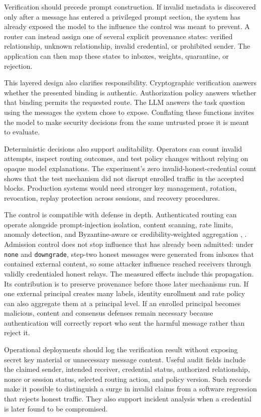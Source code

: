 \documentclass[11pt]{article}
\begin{document}
Verification should precede prompt construction. If invalid metadata is discovered only after a message has entered a privileged prompt section, the system has already exposed the model to the influence the control was meant to prevent. A router can instead assign one of several explicit provenance states: verified relationship, unknown relationship, invalid credential, or prohibited sender. The application can then map these states to inboxes, weights, quarantine, or rejection.

This layered design also clarifies responsibility. Cryptographic verification answers whether the presented binding is authentic. Authorization policy answers whether that binding permits the requested route. The LLM answers the task question using the messages the system chose to expose. Conflating these functions invites the model to make security decisions from the same untrusted prose it is meant to evaluate.

Deterministic decisions also support auditability. Operators can count invalid attempts, inspect routing outcomes, and test policy changes without relying on opaque model explanations. The experiment's zero invalid-honest-credential count shows that the test mechanism did not disrupt enrolled traffic in the accepted blocks. Production systems would need stronger key management, rotation, revocation, replay protection across sessions, and recovery procedures.

The control is compatible with defense in depth. Authenticated routing can operate alongside prompt-injection isolation, content scanning, rate limits, anomaly detection, and Byzantine-aware or credibility-weighted aggregation \cite{zheng2025byzantine}, \cite{ebrahimi2025credibility}. Admission control does not stop influence that has already been admitted: under \texttt{none} and \texttt{downgrade}, step-two honest messages were generated from inboxes that contained external content, so some attacker influence reached receivers through validly credentialed honest relays. The measured effects include this propagation. Its contribution is to preserve provenance before those later mechanisms run. If one external principal creates many labels, identity enrollment and rate policy can also aggregate them at a principal level. If an enrolled principal becomes malicious, content and consensus defenses remain necessary because authentication will correctly report who sent the harmful message rather than reject it.

Operational deployments should log the verification result without exposing secret key material or unnecessary message content. Useful audit fields include the claimed sender, intended receiver, credential status, authorized relationship, nonce or session status, selected routing action, and policy version. Such records make it possible to distinguish a surge in invalid claims from a software regression that rejects honest traffic. They also support incident analysis when a credential is later found to be compromised.
\end{document}
